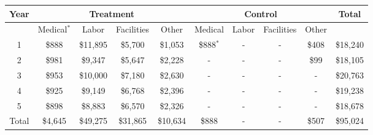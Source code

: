\begin{tabular}{ccccc|ccccc}\toprule
Year &\multicolumn{4}{c}{Treatment} &\multicolumn{4}{c}{Control} & Total \\ \midrule
& Medical$^{*}$ & Labor & Facilities & Other & Medical  & Labor & Facilities & Other& \\ \midrule
 1 	 & 	 \$888 	 & 	 \$11,895 	 & 	 \$5,700 	 & 	 \$1,053 	 & 	 \$888$^{*}$ 	 & 	 -   	 & 	 -   	 & 	 \$408 	 & 	 \$18,240 	 \\ 
 2 	 & 	 \$981 	 & 	 \$9,347 	 & 	 \$5,647 	 & 	 \$2,228 	 & 	 -   	 & 	 -   	 & 	 -   	 & 	 \$99 	 & 	 \$18,105 	 \\ 
 3 	 & 	 \$953 	 & 	 \$10,000 	 & 	 \$7,180 	 & 	 \$2,630 	 & 	 -   	 & 	 -   	 & 	 -   	 & 	 -   	 & 	 \$20,763 	 \\ 
 4 	 & 	 \$925 	 & 	 \$9,149 	 & 	 \$6,768 	 & 	 \$2,396 	 & 	 -   	 & 	 -   	 & 	 -   	 & 	 -   	 & 	 \$19,238 	 \\ 
 5 	 & 	 \$898 	 & 	 \$8,883 	 & 	 \$6,570 	 & 	 \$2,326 	 & 	 -   	 & 	 -   	 & 	 -   	 & 	 -   	 & 	 \$18,678 	 \\ \hline
 Total 	 & 	 \$4,645 	 & 	 \$49,275 	 & 	 \$31,865 	 & 	 \$10,634 	 & 	 \$888 	 & 	 -   	 & 	 -   	 & 	 \$507 	 & 	 \$95,024 	 \\
\bottomrule
\end{tabular}